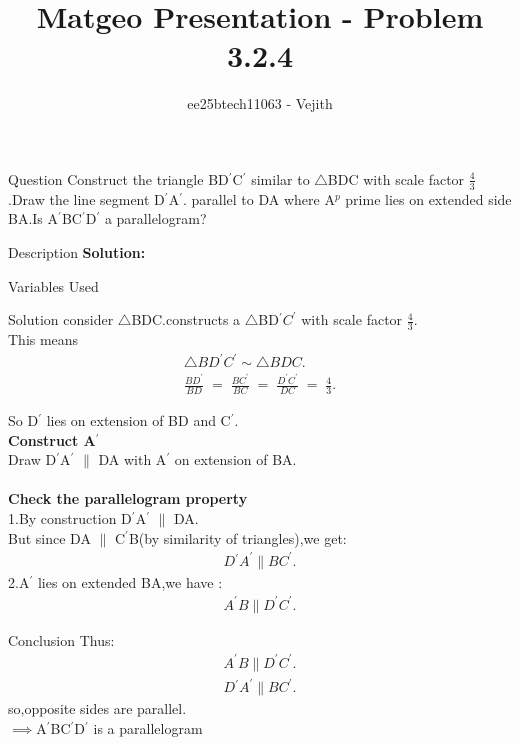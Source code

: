 \documentclass{beamer}
\title{Matgeo Presentation - Problem 3.2.4}
\author{ee25btech11063 - Vejith}
\numberwithin{equation}{section}
\theoremstyle{remark}
\begin{document}
\frame{\titlepage}
\begin{frame}{Question}
Construct the triangle BD$^{\prime}$C$^{\prime}$ similar to $\triangle$BDC with scale factor $\frac{4}{3}$.Draw the line segment D$^{\prime}$A$^{\prime}$. parallel to DA where A$^p$ prime lies on extended side BA.Is A$^{\prime}$BC$^{\prime}$D$^{\prime}$ a parallelogram?
\end{frame}

\begin{frame}{Description}
\textbf{Solution: }\\
\begin{table}[h!]    
  \centering
  
  \caption{Variables Used}
  \label{}
\end{table}
\end{frame}

\begin{frame}{Solution}
consider $\triangle$BDC.constructs a $\triangle$BD$^{\prime}C^{\prime}$
 with scale factor $\frac{4}{3}$.\\
This means 
\begin{align}
  \triangle BD^{\prime}C^{\prime} \sim \triangle BDC.\\
\frac{BD^{\prime}}{BD} \;=\; \frac{BC^{\prime}}{BC} \;=\; \frac{D^{\prime}C^{\prime}}{DC} \;=\; \frac{4}{3}.
\end{align}

So D$^{\prime}$ lies on extension of BD and C$^{\prime}$.\\
\textbf{Construct A$^{\prime}$}\\
Draw D$^{\prime}$A$^{\prime}$ $\parallel$ DA with A$^{\prime}$ on extension of BA.\\ \\
\textbf{Check the parallelogram property}\\
1.By construction    D$^{\prime}$A$^{\prime}$ $\parallel$ DA.\\
But since DA $\parallel$ C$^{\prime}$B(by similarity of triangles),we get:
\begin{align}
    D{^\prime}A^{\prime} \parallel BC^{\prime}.
\end{align}
2.A$^{\prime}$ lies on extended BA,we have :
\begin{align}
    A^{\prime}B \parallel D^{\prime}C^{\prime}.
\end{align}
\end{frame}

\begin{frame}{Conclusion}
Thus:
\begin{align}
    A^{\prime}B \parallel D^{\prime}C^{\prime}.\\
D{^\prime}A^{\prime} \parallel BC^{\prime}.
\end{align}
so,opposite sides are parallel.\\
$\implies$A$^{\prime}$BC$^{\prime}$D$^{\prime}$ is a parallelogram
\end{frame}
\end{document}
